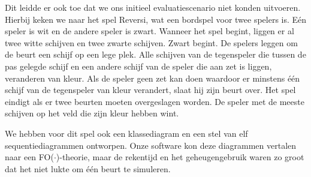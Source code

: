 Dit leidde er ook toe dat we ons initieel evaluatiescenario niet konden uitvoeren. Hierbij keken we naar het spel Reversi, wat een bordspel voor twee spelers is. E\'en speler is wit en de andere speler is zwart. Wanneer het spel begint, liggen er al twee witte schijven en twee zwarte schijven. Zwart begint. De spelers leggen om de beurt een schijf op een lege plek. Alle schijven van de tegenspeler die tussen de pas gelegde schijf en een andere schijf van de speler die aan zet is liggen, veranderen van kleur. Als de speler geen zet kan doen waardoor er minstens \'e\'en schijf van de tegenspeler van kleur verandert, slaat hij zijn beurt over. Het spel eindigt als er twee beurten moeten overgeslagen worden. De speler met de meeste schijven op het veld die zijn kleur hebben wint.

We hebben voor dit spel ook een klassediagram en een stel van elf sequentiediagrammen ontworpen. Onze software kon deze diagrammen vertalen naar een FO($\cdot$)-theorie, maar de rekentijd en het geheugengebruik waren zo groot dat het niet lukte om \'e\'en beurt te simuleren.